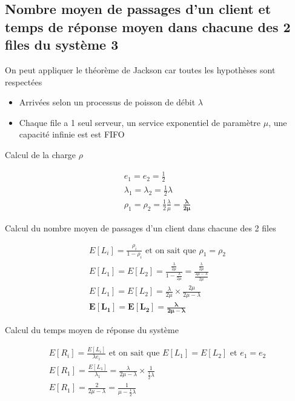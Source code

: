 \documentclass[12pt, a4paper]{article}
\begin{document}
\newpage
\subsection{Nombre moyen de passages d'un client et temps de r\'eponse moyen dans chacune des 2 files du syst\`eme 3}

On peut appliquer le th\'eor\`eme de Jackson car toutes les hypoth\`eses sont respect\'ees
\begin{itemize}
\item Arriv\'ees selon un processus de poisson de d\'ebit $\lambda$
\item Chaque file a 1 seul serveur, un service exponentiel de param\`etre $\mu$, une capacit\'e infinie est est FIFO
\end{itemize}

\medskip
\quad Calcul de la charge $\rho$ 

\begin{gather*}
e_{1} = e_{2} = \frac{1}{2} \\
\lambda_{1} = \lambda_{2} = \frac{1}{2}\lambda \\
\rho_{1} = \rho_{2} = \frac{1}{2}\frac{\lambda}{\mu} = \bm{\frac{\lambda}{2\mu}}
\end{gather*}

\quad Calcul du nombre moyen de passages d'un client dans chacune des 2 files

\begin{gather*}
E[L_{i}] = \frac{\rho_{i}}{1-\rho_{i}} \text{ et on sait que } \rho_{1}=\rho_{2} \\
E[L_{1}] = E[L_{2}] = \frac{\frac{\lambda}{2\mu}}{1-\frac{\lambda}{2\mu}} = \frac{\frac{\lambda}{2\mu}}{\frac{2\mu - \lambda}{2\mu}} \\
E[L_{1}] = E[L_{2}] = \frac{\lambda}{2\mu}\times\frac{2\mu}{2\mu - \lambda} \\
\bm{E[L_{1}] = E[L_{2}] = \frac{\lambda}{2\mu - \lambda}}
\end{gather*}

\quad Calcul du temps moyen de r\'eponse du syst\`eme

\begin{gather*}
E[R_{i}] = \frac{E[L_{i}]}{\lambda e_{i}} \text{ et on sait que } E[L_{1}] = E[L_{2}] \text{ et } e_{1}=e_{2} \\
E[R_{1}]=\frac{E[L_{1}]}{\lambda_{1}}=\frac{\lambda}{2\mu-\lambda}\times\frac{1}{\frac{1}{2}\lambda} \\
E[R_{1}]=\frac{2}{2\mu-\lambda} = \frac{1}{\mu-\frac{1}{2}\lambda}
\end{gather*}
\end{document}

